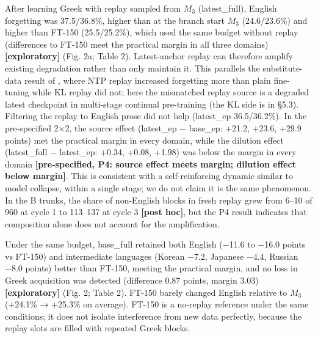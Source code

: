 \documentclass[11pt]{article}
\begin{document}
After learning Greek with replay sampled from $M_3$ (latest\_full), English forgetting was 37.5/36.8\%, higher than at the branch start $M_3$ (24.6/23.6\%) and higher than FT-150 (25.5/25.2\%), which used the same budget without replay (differences to FT-150 meet the practical margin in all three domains) \textbf{[exploratory]} (Fig. 2a; Table 2). Latest-anchor replay can therefore amplify existing degradation rather than only maintain it. This parallels the substitute-data result of \citet[Fig.~9]{marek2026}, where NTP replay increased forgetting more than plain fine-tuning while KL replay did not; here the mismatched replay source is a degraded latest checkpoint in multi-stage continual pre-training (the KL side is in §5.3). Filtering the replay to English prose did not help (latest\_ep 36.5/36.2\%). In the pre-specified 2×2, the source effect (latest\_ep − base\_ep: +21.2, +23.6, +29.9 points) met the practical margin in every domain, while the dilution effect (latest\_full − latest\_ep: +0.34, +0.08, +1.98) was below the margin in every domain \textbf{[pre-specified, P4: source effect meets margin; dilution effect below margin]}. This is consistent with a self-reinforcing dynamic similar to model collapse, within a single stage; we do not claim it is the same phenomenon. In the B trunks, the share of non-English blocks in fresh replay grew from 6–10 of 960 at cycle 1 to 113–137 at cycle 3 \textbf{[post hoc]}, but the P4 result indicates that composition alone does not account for the amplification.

Under the same budget, base\_full retained both English (−11.6 to −16.0 points vs FT-150) and intermediate languages (Korean −7.2, Japanese −4.4, Russian −8.0 points) better than FT-150, meeting the practical margin, and no loss in Greek acquisition was detected (difference 0.87 points, margin 3.03) \textbf{[exploratory]} (Fig. 2; Table 2). FT-150 barely changed English relative to $M_3$ (+24.1\% → +25.3\% on average). FT-150 is a no-replay reference under the same conditions; it does not isolate interference from new data perfectly, because the replay slots are filled with repeated Greek blocks.
\end{document}
